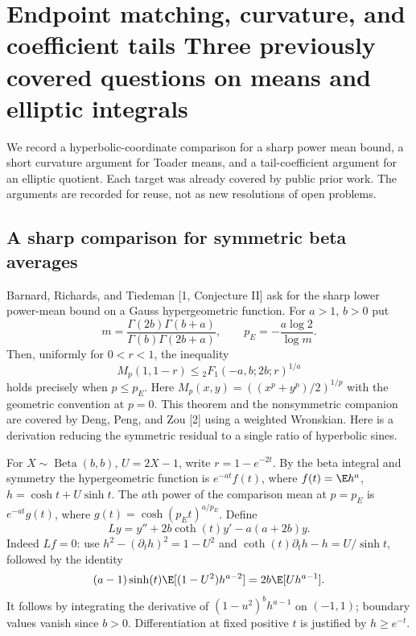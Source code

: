 \documentclass[11pt,a4paper]{article}
\numberwithin{equation}{section}
\theoremstyle{definition}
\theoremstyle{remark}
\newenvironment{sectionabstract}{\par\smallskip\begingroup\small\noindent}{\par\endgroup\medskip}
\begin{document}
\section{\texorpdfstring{Endpoint matching, curvature, and coefficient tails Three previously covered questions on means and elliptic integrals}{Endpoint matching, curvature, and coefficient tails Three previously covered questions on means and elliptic integrals}}\label{section:r37showa}
\par\medskip


\begin{sectionabstract}
We record a hyperbolic-coordinate comparison for a sharp power mean bound, a short curvature argument for Toader means, and a tail-coefficient argument for an elliptic quotient. Each target was already covered by public prior work. The arguments are recorded for reuse, not as new resolutions of open problems.
\end{sectionabstract}

\subsection{A sharp comparison for symmetric beta averages}
Barnard, Richards, and Tiedeman [1, Conjecture II] ask for the sharp lower
power-mean bound on a Gauss hypergeometric function. For $a>1$, $b>0$ put
\[
 m=\frac{\Gamma(2b)\Gamma(b+a)}{\Gamma(b)\Gamma(2b+a)},\qquad
 p_E=-\frac{a\log 2}{\log m}.
\]
Then, uniformly for $0<r<1$, the inequality
\[
 M_p(1,1-r)\le {}_2F_1(-a,b;2b;r)^{1/a}
\]
holds precisely when $p\le p_E$. Here $M_p(x,y)=((x^p+y^p)/2)^{1/p}$ with the geometric convention at $p=0$. This theorem and the nonsymmetric companion are covered by Deng, Peng, and Zou [2] using a weighted Wronskian. Here is a derivation reducing the symmetric residual to a single ratio of hyperbolic sines.

For $X\sim\operatorname{Beta}(b,b)$, $U=2X-1$, write $r=1-e^{-2t}$. By
the beta integral and symmetry the hypergeometric function is
$e^{-at}f(t)$, where $f(t)=\E h^a$, $h=\cosh t+U\sinh t$. The $a$th power of the comparison mean at $p=p_E$ is $e^{-at}g(t)$, where
$g(t)=\cosh(p_Et)^{a/p_E}$. Define
\[
 Ly=y''+2b\coth(t)y'-a(a+2b)y .
\]
Indeed $Lf=0$: use $h^2-(\partial_t h)^2=1-U^2$ and
$\coth(t)\partial_t h-h=U/\sinh t$, followed by the identity
\[
 (a-1)\sinh(t)\E[(1-U^2)h^{a-2}]=2b\E[Uh^{a-1}].
\]
It follows by integrating the derivative of $(1-u^2)^b h^{a-1}$ on $(-1,1)$; boundary values vanish since $b>0$. Differentiation at fixed positive $t$ is justified by $h\ge e^{-t}$.
\end{document}
